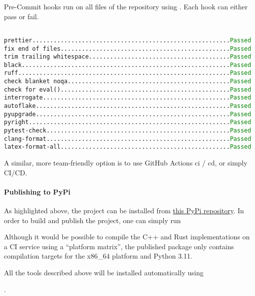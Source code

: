 \begin{table}
  \centering
  \caption{Pre-Commit hooks run on all files of the repository using . Each hook can either pass or fail.}
  \texttt{
    \hspace*{-1em} prettier........................................................\textcolor{green}{Passed} \\
    fix end of files................................................\textcolor{green}{Passed} \\
    trim trailing whitespace........................................\textcolor{green}{Passed} \\
    black...........................................................\textcolor{green}{Passed} \\
    ruff............................................................\textcolor{green}{Passed} \\
    check blanket noqa..............................................\textcolor{green}{Passed} \\
    check for eval()................................................\textcolor{green}{Passed} \\
    interrogate.....................................................\textcolor{green}{Passed} \\
    autoflake.......................................................\textcolor{green}{Passed} \\
    pyupgrade.......................................................\textcolor{green}{Passed} \\
    pyright.........................................................\textcolor{green}{Passed} \\
    pytest-check....................................................\textcolor{green}{Passed} \\
    clang-format....................................................\textcolor{green}{Passed} \\
    latex-format-all................................................\textcolor{green}{Passed}
  }
\end{table}

A similar, more team-friendly option is to use GitHub Actions \gls{ci} / \gls{cd}, or simply CI/CD.

\paragraph{Publishing to PyPi}
As highlighted above, the project can be installed from \href{https://pypi.org/project/melon-scheduler/}{this PyPi repository}.
In order to build and publish the project, one can simply run


Although it would be possible to compile the C++ and Rust implementations on a CI service using a ``platform matrix'', the published package only contains compilation targets for the x86\_64 platform and Python 3.11.

All the tools described above will be installed automatically using

.
